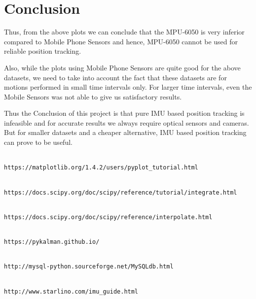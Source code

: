 \chapter{Conclusion}



Thus, from the above plots we can conclude that the MPU-6050 is very
inferior compared to Mobile Phone Sensors and hence, MPU-6050 cannot
be used for reliable position tracking.

Also, while the plots using Mobile Phone Sensors are quite good for the
above datasets, we need to take into account the fact that these datasets
are for motions performed in small time intervals only. For larger time
intervals, even the Mobile Sensors was not able to give us satisfactory
results.

Thus the Conclusion of this project is that pure IMU based position
tracking is infeasible and for accurate results we always require optical
sensors and cameras. But for smaller datasets and a cheaper alternative,
IMU based position tracking can prove to be useful.


\begin{thebibliography}{}

\\\texttt{https://matplotlib.org/1.4.2/users/pyplot_tutorial.html}

\\\texttt{https://docs.scipy.org/doc/scipy/reference/tutorial/integrate.html}

\\\texttt{https://docs.scipy.org/doc/scipy/reference/interpolate.html}

\\\texttt{https://pykalman.github.io/}

\\\texttt{http://mysql-python.sourceforge.net/MySQLdb.html}

\\\texttt{http://www.starlino.com/imu_guide.html}

\end{thebibliography}



